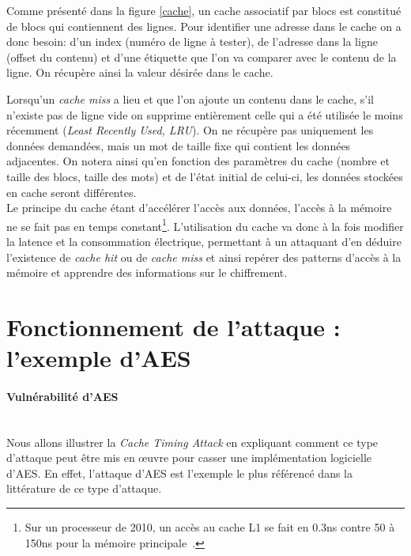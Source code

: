 \documentclass[a4paper,11pt]{article}
\begin{document}
Comme présenté dans la figure \ref{cache}, un cache associatif par blocs est constitué de blocs qui contiennent des lignes. Pour identifier une adresse dans le cache on a donc besoin: d'un index (numéro de ligne à tester), de l'adresse dans la ligne (offset du contenu) et d'une étiquette que l'on va comparer avec le contenu de la ligne. On récupère ainsi la valeur désirée dans le cache. 

Lorsqu'un \emph{cache miss} a lieu et que l'on ajoute un contenu dans le cache, s'il n'existe pas de ligne vide on supprime entièrement celle qui a été utilisée le moins récemment (\emph{Least Recently Used, LRU}). On ne récupère pas uniquement les données demandées, mais un mot de taille fixe qui contient les données adjacentes. On notera ainsi qu'en fonction des paramètres du cache (nombre et taille des blocs, taille des mots) et de l'état initial de celui-ci, les données stockées en cache seront différentes.\\

Le principe du cache étant d'accélérer l'accès aux données, l'accès à la mémoire ne se fait pas en temps constant\footnote{Sur un processeur de 2010, un accès au cache L1 se fait en 0.3ns contre 50 à 150ns pour la mémoire principale~\cite{tromer2010efficient}.}. L'utilisation du cache va donc à la fois modifier la latence et la consommation électrique, permettant à un attaquant d'en déduire l'existence de \emph{cache hit} ou de \emph{cache miss} et ainsi repérer des patterns d'accès à la mémoire et apprendre des informations sur le chiffrement.



\section{Fonctionnement de l'attaque : l'exemple d'AES}

\paragraph{Vulnérabilité d'AES}~\\
Nous allons illustrer la \emph{Cache Timing Attack} en expliquant comment ce type d'attaque peut être mis en œuvre pour casser une implémentation logicielle d'AES. En effet, l'attaque d'AES est l'exemple le plus référencé dans la littérature de ce type d'attaque.
\end{document}
